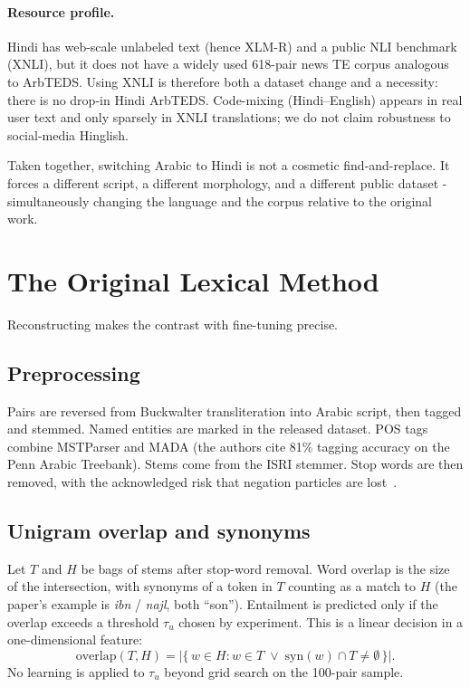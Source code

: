 \documentclass[conference]{IEEEtran}
\begin{document}
\paragraph{Resource profile.}
Hindi has web-scale unlabeled text (hence XLM-R) and a public NLI benchmark (XNLI), but it does not have a widely used 618-pair news TE corpus analogous to ArbTEDS. Using XNLI is therefore both a dataset change and a necessity: there is no drop-in Hindi ArbTEDS. Code-mixing (Hindi--English) appears in real user text and only sparsely in XNLI translations; we do not claim robustness to social-media Hinglish.

Taken together, switching Arabic to Hindi is not a cosmetic find-and-replace. It forces a different script, a different morphology, and a different public dataset - simultaneously changing the language and the corpus relative to the original work.

\section{The Original Lexical Method}
\label{sec:khader}

Reconstructing \citet{khader2016textual} makes the contrast with fine-tuning precise.

\subsection{Preprocessing}
Pairs are reversed from Buckwalter transliteration into Arabic script, then tagged and stemmed. Named entities are marked in the released dataset. POS tags combine MSTParser and MADA (the authors cite 81\% tagging accuracy on the Penn Arabic Treebank). Stems come from the ISRI stemmer. Stop words are then removed, with the acknowledged risk that negation particles are lost~\citep{alkhawaldeh2015negation}.

\subsection{Unigram overlap and synonyms}
Let $T$ and $H$ be bags of stems after stop-word removal. Word overlap is the size of the intersection, with synonyms of a token in $T$ counting as a match to $H$ (the paper's example is \textit{ibn} / \textit{najl}, both ``son''). Entailment is predicted only if the overlap exceeds a threshold $\tau_u$ chosen by experiment. This is a linear decision in a one-dimensional feature:
\begin{equation}
  \mathrm{overlap}(T,H)
  = \bigl|\{\,w \in H : w \in T \;\vee\; \mathrm{syn}(w)\cap T \neq \emptyset\,\}\bigr|.
\end{equation}
No learning is applied to $\tau_u$ beyond grid search on the 100-pair sample.
\end{document}
